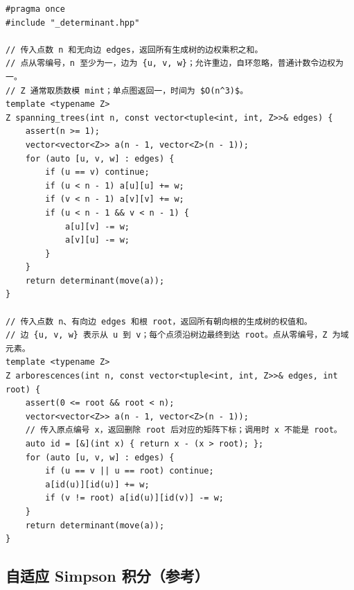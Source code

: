 \begin{lstlisting}
#pragma once
#include "_determinant.hpp"

// 传入点数 n 和无向边 edges，返回所有生成树的边权乘积之和。
// 点从零编号，n 至少为一，边为 {u, v, w}；允许重边，自环忽略，普通计数令边权为一。
// Z 通常取质数模 mint；单点图返回一，时间为 $O(n^3)$。
template <typename Z>
Z spanning_trees(int n, const vector<tuple<int, int, Z>>& edges) {
    assert(n >= 1);
    vector<vector<Z>> a(n - 1, vector<Z>(n - 1));
    for (auto [u, v, w] : edges) {
        if (u == v) continue;
        if (u < n - 1) a[u][u] += w;
        if (v < n - 1) a[v][v] += w;
        if (u < n - 1 && v < n - 1) {
            a[u][v] -= w;
            a[v][u] -= w;
        }
    }
    return determinant(move(a));
}

// 传入点数 n、有向边 edges 和根 root，返回所有朝向根的生成树的权值和。
// 边 {u, v, w} 表示从 u 到 v；每个点须沿树边最终到达 root。点从零编号，Z 为域元素。
template <typename Z>
Z arborescences(int n, const vector<tuple<int, int, Z>>& edges, int root) {
    assert(0 <= root && root < n);
    vector<vector<Z>> a(n - 1, vector<Z>(n - 1));
    // 传入原点编号 x，返回删除 root 后对应的矩阵下标；调用时 x 不能是 root。
    auto id = [&](int x) { return x - (x > root); };
    for (auto [u, v, w] : edges) {
        if (u == v || u == root) continue;
        a[id(u)][id(u)] += w;
        if (v != root) a[id(u)][id(v)] -= w;
    }
    return determinant(move(a));
}
\end{lstlisting}

\subsection{自适应 Simpson 积分（参考）}
\par


